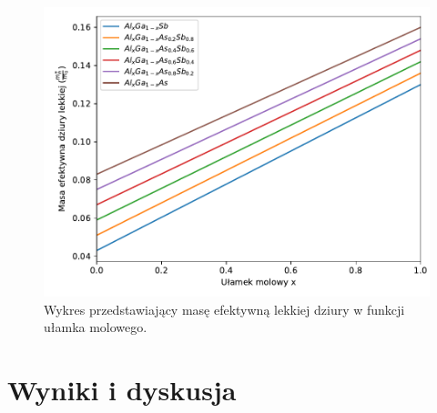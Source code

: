 \documentclass[12pt,openany,a4paper]{book}
\begin{document}
\begin{figure}[H]
	\centering
	\includegraphics[width = 0.9\linewidth]{Figures/quaternary/quat_m_lh_y.pdf}
	\caption{Wykres przedstawiający masę efektywną lekkiej dziury w funkcji ułamka 
	molowego.}\label{fig:quat_mlh_y}
\end{figure}



\chapter{Wyniki i dyskusja}\label{chapt:results}
\end{document}
